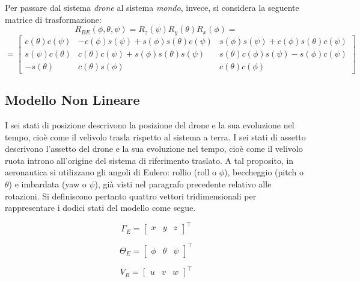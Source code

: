 Per passare dal sistema \emph{drone} al sistema \emph{mondo}, invece, si considera la seguente matrice di trasformazione:
\[
R_{BE}(\phi,\theta,\psi) = 
R_z(\psi)R_y(\theta)R_x(\phi) = 
\]
\begin{equation}
=
\begin{bmatrix}
c(\theta)c(\psi) & -c(\phi)s(\psi)+s(\phi)s(\theta)c(\psi) & s(\phi)s(\psi)+c(\phi)s(\theta)c(\psi)\\
s(\psi)c(\theta) & c(\theta)c(\psi)+s(\phi)s(\theta)s(\psi) & s(\theta)c(\phi)s(\psi)-s(\phi)c(\psi)\\
-s(\theta) & c(\theta)s(\phi) & c(\theta)c(\phi)
\end{bmatrix}
\label{dcmBE}
\end{equation}

\subsection{Modello Non Lineare}

I sei stati di posizione descrivono la posizione del drone e la sua evoluzione nel tempo, cioè come il velivolo trasla rispetto al sistema a terra. I sei stati di assetto descrivono l'assetto del drone e la sua evoluzione nel tempo, cioè come il velivolo ruota introno all'origine del sistema di riferimento traslato. A tal proposito, in aeronautica si utilizzano gli angoli di Eulero: rollio (roll o $\phi$), beccheggio (pitch o $\theta$) e imbardata (yaw o $\psi$), già visti nel paragrafo precedente relativo alle rotazioni. Si definiscono pertanto quattro vettori tridimensionali per rappresentare i dodici stati del modello come segue.

\begin{equation}
\Gamma_E = \begin{bmatrix}
x & y & z 
\end{bmatrix}^\top
\label{statePos}
\end{equation}

\begin{equation}
\Theta_E = \begin{bmatrix}
\phi & \theta & \psi
\end{bmatrix}^\top
\label{stateEul}
\end{equation}

\begin{equation}
V_B = \begin{bmatrix}
u & v & w
\end{bmatrix}^\top
\label{stateVelLin}
\end{equation}

